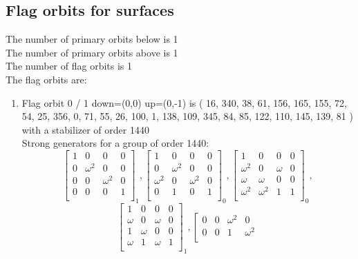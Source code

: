 \subsection*{Flag orbits for surfaces}
The number of primary orbits below is 1\\
The number of primary orbits above is 1\\
The number of flag orbits is 1\\
The flag orbits are:
\begin{enumerate}[(1)]
\item
Flag orbit 0 / 1 down=(0,0) up=(0,-1) is ( 16, 340, 38, 61, 156, 165, 155, 72, 54, 25, 356, 0, 71, 55, 26, 100, 1, 138, 109, 345, 84, 85, 122, 110, 145, 139, 81 ) with a stabilizer of order 1440\\
Strong generators for a group of order 1440:
$$
\left[
\begin{array}{*{4}{r}}
1 & 0 & 0 & 0\\
0 & \omega^{2} & 0 & 0\\
0 & 0 & \omega^{2} & 0\\
0 & 0 & 0 & 1\\
\end{array}
\right]
_{1}
, 
\left[
\begin{array}{*{4}{r}}
1 & 0 & 0 & 0\\
0 & \omega^{2} & 0 & 0\\
\omega^{2} & 0 & \omega^{2} & 0\\
0 & 1 & 0 & 1\\
\end{array}
\right]
_{0}
, 
\left[
\begin{array}{*{4}{r}}
1 & 0 & 0 & 0\\
\omega^{2} & 0 & \omega  & 0\\
\omega  & \omega  & 0 & 0\\
\omega^{2} & \omega^{2} & 1 & 1\\
\end{array}
\right]
_{0}
, 
$$
$$
\left[
\begin{array}{*{4}{r}}
1 & 0 & 0 & 0\\
\omega  & 0 & \omega  & 0\\
1 & \omega  & 0 & 0\\
\omega  & 1 & \omega  & 1\\
\end{array}
\right]
_{1}
, 
\left[
\begin{array}{*{4}{r}}
0 & 0 & \omega^{2} & 0\\
0 & 0 & 1 & \omega^{2}\\

\end{array}$$
\end{enumerate}
